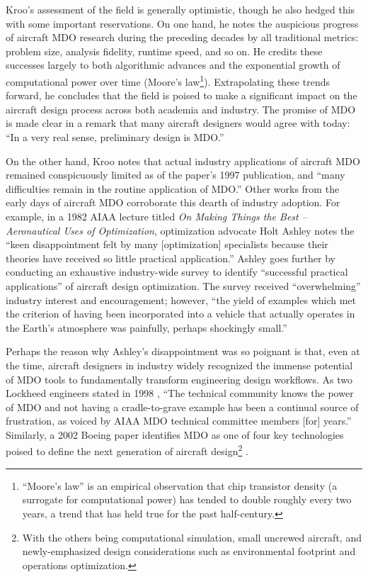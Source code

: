 Kroo's assessment of the field is generally optimistic, though he also hedged this with some important reservations. On one hand, he notes the auspicious progress of aircraft MDO research during the preceding decades by all traditional metrics: problem size, analysis fidelity, runtime speed, and so on. He credits these successes largely to both algorithmic advances and the exponential growth of computational power over time (Moore's law\footnote{``Moore's law'' is an empirical observation that chip transistor density (a surrogate for computational power) has tended to double roughly every two years, a trend that has held true for the past half-century.}). Extrapolating these trends forward, he concludes that the field is poised to make a significant impact on the aircraft design process across both academia and industry. The promise of MDO is made clear in a remark that many aircraft designers would agree with today: ``In a very real sense, preliminary design is MDO.'' \cite{kroo_multidisciplinary_1997}

On the other hand, Kroo notes that actual industry applications of aircraft MDO remained conspicuously limited as of the paper's 1997 publication, and ``many difficulties remain in the routine application of MDO.'' \cite{kroo_multidisciplinary_1997} Other works from the early days of aircraft MDO corroborate this dearth of industry adoption. For example, in a 1982 AIAA lecture titled \textit{On Making Things the Best -- Aeronautical Uses of Optimization}, optimization advocate Holt Ashley notes the ``keen disappointment felt by many [optimization] specialists because their theories have received so little practical application.'' \cite{ashley_making_1982} Ashley goes further by conducting an exhaustive industry-wide survey to identify ``successful practical applications'' of aircraft design optimization. The survey received ``overwhelming'' industry interest and encouragement; however, ``the yield of examples which met the criterion of having been incorporated into a vehicle that actually operates in the Earth's atmosphere was painfully, perhaps shockingly small.''

Perhaps the reason why Ashley's disappointment was so poignant is that, even at the time, aircraft designers in industry widely recognized the immense potential of MDO tools to fundamentally transform engineering design workflows. As two Lockheed engineers stated in 1998 \cite{radovcich_f22_1998}, ``The technical community knows the power of MDO and not having a cradle-to-grave example has been a continual source of frustration, as voiced by AIAA MDO technical committee members [for] years.'' Similarly, a 2002 Boeing paper identifies MDO as one of four key technologies poised to define the next generation of aircraft design\footnote{With the others being computational simulation, small uncrewed aircraft, and newly-emphasized design considerations such as environmental footprint and operations optimization.} \cite{mcmasters_airplane_2002}.


